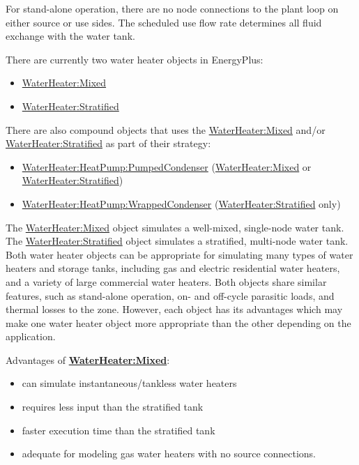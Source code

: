 For stand-alone operation, there are no node connections to the plant loop on either source or use sides. The scheduled use flow rate determines all fluid exchange with the water tank.

There are currently two water heater objects in EnergyPlus:

\begin{itemize}
\item
  \hyperref[waterheatermixed]{WaterHeater:Mixed}
\item
  \hyperref[waterheaterstratified]{WaterHeater:Stratified}
\end{itemize}

There are also compound objects that uses the \hyperref[waterheatermixed]{WaterHeater:Mixed} and/or \hyperref[waterheaterstratified]{WaterHeater:Stratified} as part of their strategy:

\begin{itemize}
\tightlist
\item
  \hyperref[waterheaterheatpumppumpedcondenser]{WaterHeater:HeatPump:PumpedCondenser} (\hyperref[waterheatermixed]{WaterHeater:Mixed} or \hyperref[waterheaterstratified]{WaterHeater:Stratified})
\item
  \hyperref[waterheaterheatpumpwrappedcondenser]{WaterHeater:HeatPump:WrappedCondenser} (\hyperref[waterheaterstratified]{WaterHeater:Stratified} only)
\end{itemize}

The \hyperref[waterheatermixed]{WaterHeater:Mixed} object simulates a well-mixed, single-node water tank. The \hyperref[waterheaterstratified]{WaterHeater:Stratified} object simulates a stratified, multi-node water tank. Both water heater objects can be appropriate for simulating many types of water heaters and storage tanks, including gas and electric residential water heaters, and a variety of large commercial water heaters. Both objects share similar features, such as stand-alone operation, on- and off-cycle parasitic loads, and thermal losses to the zone. However, each object has its advantages which may make one water heater object more appropriate than the other depending on the application.

Advantages of \textbf{\hyperref[waterheatermixed]{WaterHeater:Mixed}}:

\begin{itemize}
\item
  can simulate instantaneous/tankless water heaters
\item
  requires less input than the stratified tank
\item
  faster execution time than the stratified tank
\item
  adequate for modeling gas water heaters with no source connections.
\end{itemize}

